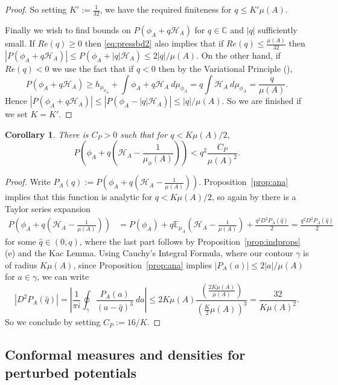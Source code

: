 \documentclass[11pt, reqno]{amsart}
\numberwithin{equation}{section}
\theoremstyle{plain}%
\newtheorem{cor}[thm]{Corollary}
\theoremstyle{definition}
\def\E{\mathbb E}
\renewcommand{\H}{\mathcal{H}}
\theoremstyle{nonumberplain}
\begin{document}
\begin{proof}
So setting $K':= \frac{1}{32 }$, we have the required finiteness for $q\le K'\mu(A)$. 

Finally we wish to find bounds on $P\left(\phi_A+q\H_A \right)$ for $q\in \mathbb{C}$ and $|q|$ sufficiently small.  If $Re(q)\ge 0$ then 
\eqref{eq:pressbd2} also implies that  if $Re(q) \le \frac{\mu(A)}{32}$ then $|P\left(\phi_A+q\H_A \right)| \le P\left(\phi_A+|q|\H_A \right)\le  2|q|/\mu(A)$.  On the other hand, if $Re(q)< 0$ we use the fact that if $q<0$ then by the Variational Principle (\cite[Theorem 3]{Sar99}),
$$P(\phi_A+q\H_A) \ge h_{\mu_{\phi_A}}+ \int \phi_A +q\H_A~d\mu_{\phi_A} = q\int \H_A~d\mu_{\phi_A} = \frac{q}{\mu(A)}.$$
Hence  $|P\left(\phi_A+q\H_A \right)| \le |P\left(\phi_A-|q|\H_A \right)|\le  |q|/\mu(A)$.  So we are finished if we set $K=K'$.
\end{proof}

\begin{cor} 
There is $C_P>0$ such that for $q<K \mu(A)/2$,
$$P\left(\phi_A+q\left(\H_A-\frac1{\mu_\phi(A)}\right)\right)<
 q^2\frac{C_P}{\mu(A)^2}.$$
\label{cor:var}
\end{cor}

\begin{proof}
Write $P_A(q):= P\left(\phi_A+q\left(\H_A-\frac{1}{\mu(A)}\right)\right)$. Proposition~\ref{prop:ana}  implies that this function is analytic for  $q<K\mu(A)/2$, so again by  \cite[Chapter 4]{ParPol90} there is a Taylor series expansion
\begin{align*}
P\left(\phi_A+q\left(\H_A-\frac{1}{\mu(A)}\right)\right) &  = P(\phi_A)+ q \E_{\mu_A}\left(\H_A-\frac{1}{\mu(A)}\right) + \frac{q^2D^2P_A(\hat q)}2 =\frac{q^2D^2P_A(\hat q)}2
\end{align*}
 for some $\hat q\in (0, q)$, where the last part follows by Proposition~\ref{prop:indprops}(e) and the Kac Lemma.
Using Cauchy's Integral Formula, where our contour $\gamma$ is of radius $K\mu(A)$, since Proposition~\ref{prop:ana} implies  $|P_A(a)| \le 2|a|/\mu(A)$ for $a\in \gamma$, we can write 
$$\left|D^2P_A(\hat q)\right|= \left|\frac{1}{\pi i}\oint_\gamma \frac{P_A(a)}{(a- \hat q)^{3}}~da\right|\le 2 K\mu(A) \frac{\left(\frac{2K\mu(A)}{\mu(A)}\right)}{\left(\frac K2\mu(A)\right)^3} = \frac{32}{ K\mu(A)^2}.$$
So we conclude by setting $C_P:= 16/K$.
\end{proof}


\subsection{Conformal measures and densities for perturbed potentials}
\end{document}
